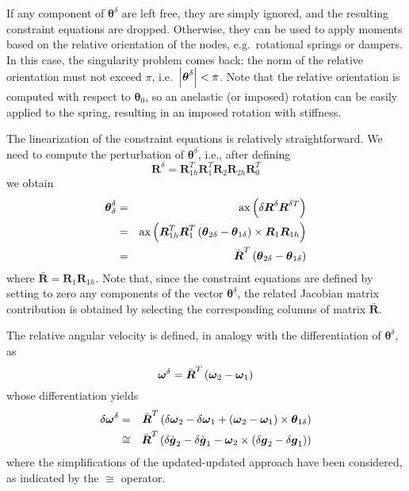 \documentclass[10pt,dvips]{report}
\newcommand{\T}[1]{\boldsymbol{#1}}
\begin{document}
\noindent
If any component of $\T{\theta}^{\delta}$ are left free, they are
simply ignored, and the resulting constraint equations are dropped.
Otherwise, they can be used to apply moments based on the 
relative orientation of the nodes, e.g.\ rotational springs or 
dampers.
In this case, the singularity problem comes back: the norm
of the relative orientation must not exceed $\pi$, i.e.\
$\shbr{\T{\theta}^{\delta}}<\pi$.
Note that the relative orientation is computed with respect to 
$\T{\theta}_0$, so an anelastic (or imposed) rotation can be easily
applied to the spring, resulting in an imposed rotation with stiffness.

\noindent
The linearization of the constraint equations is relatively 
straightforward. 
We need to compute the perturbation of $\T{\theta}^{\delta}$, i.e.,
after defining
\begin{displaymath}
	\T{R}^{\delta} = \T{R}_{1h}^T \T{R}_1^T \T{R}_2 \T{R}_{2h} \T{R}_0^T
\end{displaymath}
we obtain
\begin{eqnarray*}
	\T{\theta}^{\delta}_{\delta}
	& = & \llk{ax}\plbr{\delta\T{R}^{\delta} \T{R}^{\delta T}} \\
	& = & \llk{ax}\plbr{\T{R}_{1h}^T \T{R}_1^T
		\plbr{\T{\theta}_{2\delta} - \T{\theta}_{1\delta}}\times{}
		\T{R}_1 \T{R}_{1h}} \\
	& = & \bar{\T{R}}^T\plbr{\T{\theta}_{2\delta} - \T{\theta}_{1\delta}}
\end{eqnarray*}
where $\bar{\T{R}}=\T{R}_1 \T{R}_{1h}$.
Note that, since the constraint equations are defined by setting 
to zero any components of the vector $\T{\theta}^{\delta}$, the
related Jacobian matrix contribution is obtained by selecting 
the corresponding columns of matrix $\bar{\T{R}}$.

\noindent
The relative angular velocity is defined, in analogy with 
the differentiation of $\T{\theta}^{\delta}$, as
\begin{displaymath}
	\T{\omega}^{\delta} = \bar{\T{R}}^T\plbr{\T{\omega}_2 - \T{\omega}_1}
\end{displaymath}
whose differentiation yields
\begin{eqnarray*}
	\delta\T{\omega}^{\delta}
	& = & \bar{\T{R}}^T \plbr{
		\delta\T{\omega}_2
		- \delta\T{\omega}_1
		+ \plbr{\T{\omega}_2 - \T{\omega}_1}\times
			\T{\theta}_{1\delta}
	} \\
	& \cong & \bar{\T{R}}^T \plbr{
		\delta\dot{\T{g}}_2
		- \delta\dot{\T{g}}_1
		- \T{\omega}_2\times\plbr{\delta\T{g}_2 - \delta\T{g}_1}
	}
\end{eqnarray*}
where the simplifications of the updated-updated approach 
have been considered, as indicated by the $\cong$ operator.
\end{document}
